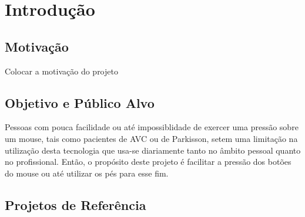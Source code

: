 \documentclass[11pt,fleqn]{book} %
\begin{document}

\pagestyle{empty} %

\tableofcontents %


\pagestyle{fancy} %



\chapter{Introdução}

\section{Motivação}
Colocar a motivação do projeto

\section{Objetivo e Público Alvo}
Pessoas com pouca facilidade ou até impossiblidade de exercer uma pressão sobre um mouse, tais como pacientes de AVC ou de Parkisson, setem uma limitação na utilização desta tecnologia que usa-se diariamente tanto no âmbito pessoal quanto no profissional. Então, o propósito deste projeto é facilitar a pressão dos botões do mouse ou até utilizar os pés para esse fim.

\section{Projetos de Referência}



\end{document}
